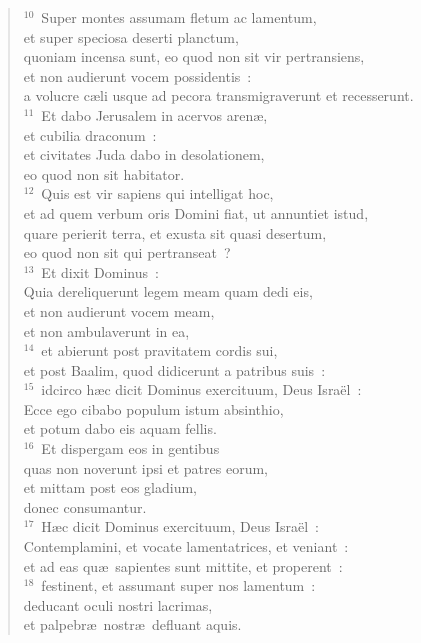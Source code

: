 \begin{verse}
${}^{10}$~Super montes assumam fletum ac lamentum,\\ et super speciosa deserti planctum,\\ quoniam incensa sunt, eo quod non sit vir pertransiens,\\ et non audierunt vocem possidentis~:\\ a volucre c\ae li usque ad pecora transmigraverunt et recesserunt.\\
${}^{11}$~Et dabo Jerusalem in acervos aren\ae ,\\ et cubilia draconum~:\\ et civitates Juda dabo in desolationem,\\ eo quod non sit habitator.\\
${}^{12}$~Quis est vir sapiens qui intelligat hoc,\\ et ad quem verbum oris Domini fiat, ut annuntiet istud,\\ quare perierit terra, et exusta sit quasi desertum,\\ eo quod non sit qui pertranseat~?\\
${}^{13}$~Et dixit Dominus~:\\ Quia dereliquerunt legem meam quam dedi eis,\\ et non audierunt vocem meam,\\ et non ambulaverunt in ea,\\
${}^{14}$~et abierunt post pravitatem cordis sui,\\ et post Baalim, quod didicerunt a patribus suis~:\\
${}^{15}$~idcirco h\ae c dicit Dominus exercituum, Deus Isra\"el~:\\ Ecce ego cibabo populum istum absinthio,\\ et potum dabo eis aquam fellis.\\
${}^{16}$~Et dispergam eos in gentibus\\ quas non noverunt ipsi et patres eorum,\\ et mittam post eos gladium,\\ donec consumantur.\\
${}^{17}$~H\ae c dicit Dominus exercituum, Deus Isra\"el~:\\ Contemplamini, et vocate lamentatrices, et veniant~:\\ et ad eas qu\ae\ sapientes sunt mittite, et properent~:\\
${}^{18}$~festinent, et assumant super nos lamentum~:\\ deducant oculi nostri lacrimas,\\ et palpebr\ae\ nostr\ae\ defluant aquis.\\

\end{verse}
